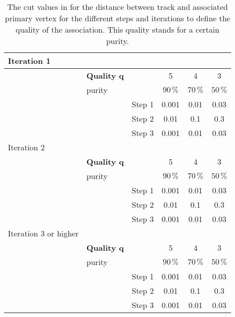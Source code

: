 
\begin{table}[h]
\begin{center}
\caption[Cut values ]{The cut values in \cm for the distance between track and associated primary vertex for the different steps and iterations to define the quality of the association. This quality stands for a certain purity.}
\label{tab:AMWFQD}
\begin{tabular}{l l c | c | c | c}

Iteration 1 & & & & & \\
\hline
 & \textbf{Quality q} & & 5 & 4 & 3  \\
 & purity & & $90\,\%$ & $70\,\%$ & $50\,\%$   \\
\hline 
 &  & Step 1 & 0.001 & 0.01 & 0.03 \\
\hline
 &  & Step 2 & 0.01 & 0.1 & 0.3 \\
\hline
 &  & Step 3 & 0.001 & 0.01 & 0.03 \\
\hline \hline

Iteration 2 & & & & & \\
\hline
 & \textbf{Quality q} & & 5 & 4 & 3  \\
 & purity & & $90\,\%$ & $70\,\%$ & $50\,\%$   \\
\hline 
 &  & Step 1 & 0.001 & 0.01 & 0.03 \\
\hline
 &  & Step 2 & 0.01 & 0.1 & 0.3 \\
\hline
 &  & Step 3 & 0.001 & 0.01 & 0.03 \\
\hline \hline

Iteration 3 or higher & & & & & \\
\hline
 & \textbf{Quality q} & & 5 & 4 & 3  \\
 & purity & & $90\,\%$ & $70\,\%$ & $50\,\%$   \\
\hline 
 &  & Step 1 & 0.001 & 0.01 & 0.03 \\
\hline
 &  & Step 2 & 0.01 & 0.1 & 0.3 \\
\hline
 &  & Step 3 & 0.001 & 0.01 & 0.03 \\
\hline \hline
\end{tabular}
\end{center}
\end{table}